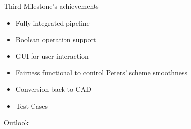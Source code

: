 \begin{frame}{Third Milestone's achievements}



\begin{itemize}
	\item[\textcolor{green}{\Checkmark}] Fully integrated pipeline 
	
	\item[\textcolor{green}
	{\Checkmark}] Boolean operation support
		
	\item[\textcolor{green}
	{\Checkmark}] GUI for user interaction
	
	\item[\textcolor{green}
	{\Checkmark}] Fairness functional to control Peters' scheme smoothness
	
		\item[\textcolor{green}
	{\Checkmark}] Conversion back to CAD
	
	\item[\textcolor{green}
	{\Checkmark}] Test Cases


\end{itemize}

\end{frame}

\begin{frame}{Outlook}
\end{frame}








